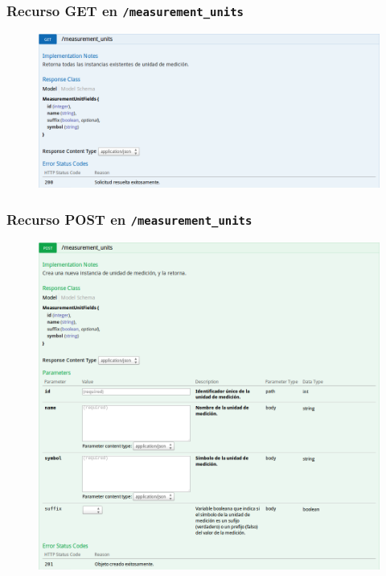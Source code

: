 \newpage


\subsubsection{Recurso GET en \texttt{/measurement\_units}}

\begin{figure}[h]
  \centering
  \includegraphics[width=\textwidth,height=.75\textheight,keepaspectratio]{img/especificacion_api/measurementUnitList_get}
  \label{measurementUnitList_get}
\end{figure}

\newpage


\subsubsection{Recurso POST en \texttt{/measurement\_units}}

\begin{figure}[h]
  \centering
  \includegraphics[width=\textwidth,height=.75\textheight,keepaspectratio]{img/especificacion_api/measurementUnitList_post}
  \label{measurementUnitList_post}
\end{figure}

